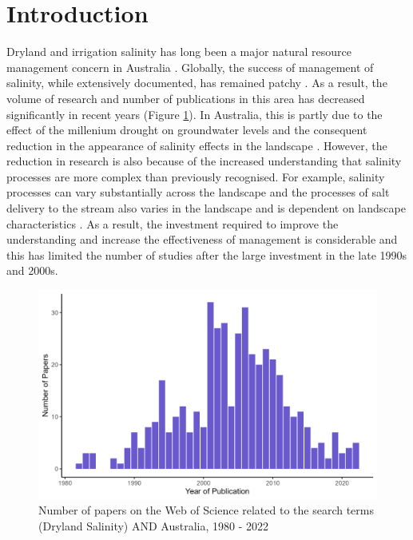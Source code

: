 \documentclass[, manuscript]{copernicus}
\begin{document}
\section{Introduction}

Dryland and irrigation salinity has long been a major natural resource
management concern in Australia
\citep{Jolly2001, White2009, Scanlon2007, Walker2002, Finlayson2010}.
Globally, the success of management of salinity, while extensively
documented, has remained patchy \citep{Leblanc2012}. As a result, the
volume of research and number of publications in this area has decreased
significantly in recent years (Figure \ref{fig:SalinityPapers}). In
Australia, this is partly due to the effect of the millenium drought on
groundwater levels and the consequent reduction in the appearance of
salinity effects in the landscape \citep{Mcfarlane2016}. However, the
reduction in research is also because of the increased understanding
that salinity processes are more complex than previously recognised. For
example, salinity processes can vary substantially across the landscape
\citep{Conyers2008} and the processes of salt delivery to the stream
also varies in the landscape \citep{Summerell2006, Hughes2007} and is
dependent on landscape characteristics \citep{vanDijk2008, Dalhaus2010}.
As a result, the investment required to improve the understanding and
increase the effectiveness of management is considerable and this has
limited the number of studies after the large investment in the late
1990s and 2000s.

\begin{figure}
\includegraphics[width=0.9\linewidth]{Figures/Dryland Salinity Papers} \caption{Number of papers on the Web of Science related to the search terms (Dryland Salinity) AND Australia, 1980 - 2022}\label{fig:SalinityPapers}
\end{figure}
\end{document}
